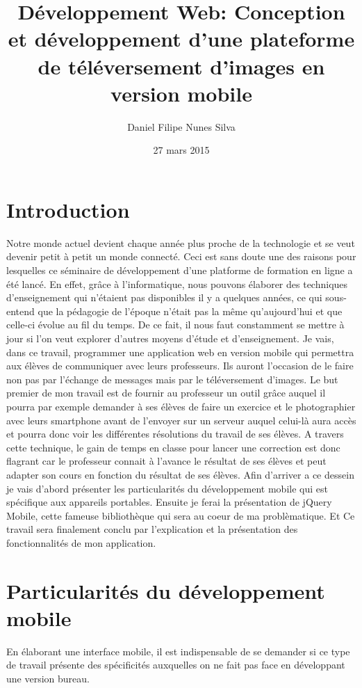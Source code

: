 \documentclass[a4paper,12pt,oneside]{sphinxmanual}
\title{Développement Web: Conception et développement d'une plateforme de téléversement d'images en version mobile}
\date{27 mars 2015}
\author{Daniel Filipe Nunes Silva}
\begin{document}
\maketitle
\tableofcontents
{}\label{index::doc}



\chapter{Introduction}
\label{intro:bienvenue-sur-le-travail-ecrit}\label{intro::doc}\label{intro:introduction}
Notre monde actuel devient chaque année plus proche de la technologie et se veut
devenir petit à petit un monde connecté. Ceci est sans doute une des raisons
pour lesquelles ce séminaire de développement d'une platforme de formation
en ligne a été lancé. En effet, grâce à l'informatique, nous pouvons élaborer
des techniques d'enseignement qui n'étaient pas disponibles il y a quelques
années, ce qui sous-entend que la pédagogie de l'époque n'était pas la même qu'aujourd'hui et que
celle-ci évolue au fil du temps. De ce fait, il nous faut constamment se mettre à jour si l'on
veut explorer d'autres moyens d'étude et d'enseignement. Je vais, dans ce travail,
programmer une application web en version mobile qui permettra aux élèves de
communiquer avec leurs professeurs. Ils auront l'occasion de le faire non pas par l'échange de messages mais par le
téléversement d'images. Le but premier de mon travail est de fournir au professeur
un outil grâce auquel il pourra par exemple demander à ses élèves de faire un
exercice et le photographier avec leurs smartphone avant de l'envoyer sur un serveur auquel celui-là
aura accès et pourra donc voir les différentes résolutions du travail de ses élèves.
A travers cette technique, le gain de temps en classe pour lancer une correction
est donc flagrant car le professeur connait à l'avance le résultat de ses élèves
et peut adapter son cours en fonction du résultat de ses élèves. Afin d'arriver a ce dessein je vais d'abord
présenter les particularités du développement mobile qui est spécifique aux
appareils portables. Ensuite je ferai la présentation de jQuery Mobile, cette
fameuse bibliothèque qui sera au coeur de ma problèmatique. Et Ce travail sera  finalement conclu
par l'explication et la présentation des fonctionnalités de mon application.


\chapter{Particularités du développement mobile}
\label{Particularit_xe9s::doc}\label{Particularit_xe9s:particularites-du-developpement-mobile}
En élaborant une interface mobile, il est indispensable de se demander
si ce type de travail présente des spécificités auxquelles on ne fait pas face en
développant une version bureau.
\end{document}
